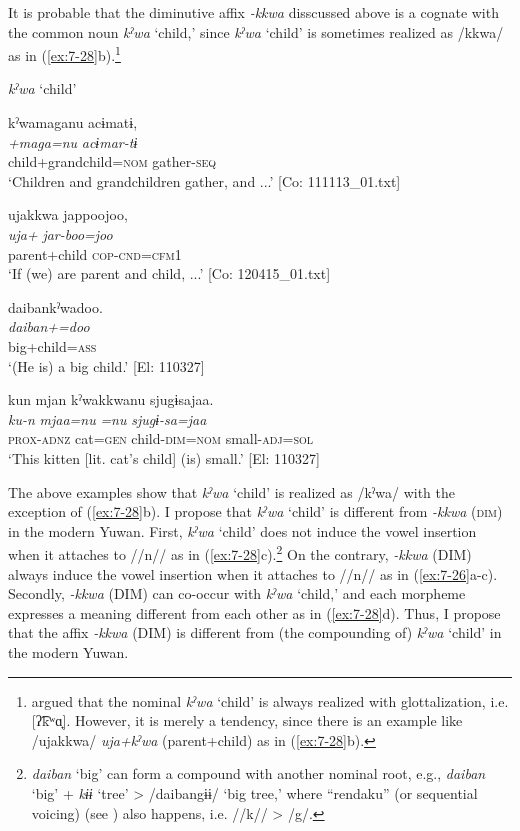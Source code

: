   It is probable that the diminutive affix \textit{{}-kkwa} disscussed above is a cognate with the common noun \textit{kˀwa} ‘child,’ since \textit{kˀwa} ‘child’ is sometimes realized as /kkwa/ as in (\ref{ex:7-28}b).\footnote{\citet[39]{Niinaga2010} argued that the nominal \textit{kˀwa} ‘child’ is always realized with glottalization, i.e. [ʔ͡kʷɑ̟]. However, it is merely a tendency, since there is an example like /ujakkwa/ \textit{uja+kˀwa} (parent+child) as in (\ref{ex:7-28}b).}

\ea \label{ex:7:28}  \textit{kˀwa} ‘child’

\ea \label{ex:7:a}{\TM}
\glll  kˀwamaganu  acɨmatɨ,\\
\textit{+maga=nu}  \textit{acɨmar-tɨ}\\
child+grandchild=\textsc{nom}  gather-\textsc{seq}\\
\glt ‘Children and grandchildren gather, and ...’ [Co: 111113\_01.txt]

\ex \label{ex:7:b}{\TM}
\glll  ujakkwa  jappoojoo,\\
\textit{uja+}  \textit{jar-boo=joo}\\
parent+child  \textsc{cop}-\textsc{cnd}=\textsc{cfm}1\\
\glt ‘If (we) are parent and child, ...’ [Co: 120415\_01.txt]

\ex \label{ex:7:c}{\TM}
\glll  daibankˀwadoo.\\
\textit{daiban+=doo}\\
big+child=\textsc{ass}\\
\glt ‘(He is) a big child.’ [El: 110327]

\ex \label{ex:7:d}{\TM}
\glll  kun  mjan  kˀwakkwanu  sjugɨsajaa.\\
\textit{ku-n}  \textit{mjaa=nu}  \textit{=nu}  \textit{sjugɨ-sa=jaa}\\
\textsc{prox}-\textsc{adnz}  cat=\textsc{gen}  child-\textsc{dim}=\textsc{nom}  small-\textsc{adj}=\textsc{sol}\\
\glt ‘This kitten [lit. cat’s child] (is) small.’ [El: 110327]

\z
\z

The above examples show that \textit{kˀwa} ‘child’ is realized as /kˀwa/ with the exception of (\ref{ex:7-28}b). I propose that \textit{kˀwa} ‘child’ is different from \textit{{}-kkwa} (\textsc{dim}) in the modern Yuwan. First, \textit{kˀwa} ‘child’ does not induce the vowel insertion when it attaches to //n// as in (\ref{ex:7-28}c).\footnote{\textit{daiban} ‘big’ can form a compound with another nominal root, e.g., \textit{daiban} ‘big’ + \textit{kɨɨ} ‘tree’ > /daibangɨɨ/ ‘big tree,’ where “rendaku” (or sequential voicing) (see ) also happens, i.e. //k// > /g/.} On the contrary, \textit{{}-kkwa} (DIM) always induce the vowel insertion when it attaches to //n// as in (\ref{ex:7-26}a-c). Secondly, \textit{{}-kkwa} (DIM) can co-occur with \textit{kˀwa} ‘child,’ and each morpheme expresses a meaning different from each other as in (\ref{ex:7-28}d). Thus, I propose that the affix \textit{{}-kkwa} (DIM) is different from (the compounding of) \textit{kˀwa} ‘child’ in the modern Yuwan.

